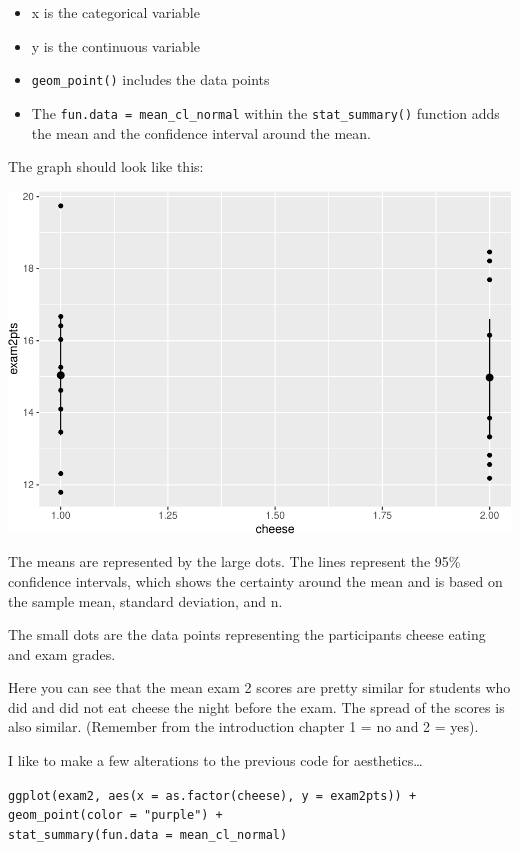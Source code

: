 \documentclass[
]{book}
\providecommand{\tightlist}{%
  \setlength{\itemsep}{0pt}\setlength{\parskip}{0pt}}
\begin{document}
\begin{itemize}
\tightlist
\item
  x is the categorical variable\\
\item
  y is the continuous variable\\
\item
  \texttt{geom\_point()} includes the data points\\
\item
  The \texttt{fun.data\ =\ mean\_cl\_normal} within the \texttt{stat\_summary()} function adds the mean and the confidence interval around the mean.
\end{itemize}

The graph should look like this:

\includegraphics{Tools-for-working-with-data-211_files/figure-latex/unnamed-chunk-3-1.pdf}

The means are represented by the large dots. The lines represent the 95\% confidence intervals, which shows the certainty around the mean and is based on the sample mean, standard deviation, and n.~

The small dots are the data points representing the participants cheese eating and exam grades.

Here you can see that the mean exam 2 scores are pretty similar for students who did and did not eat cheese the night before the exam. The spread of the scores is also similar. (Remember from the introduction chapter 1 = no and 2 = yes).

I like to make a few alterations to the previous code for aesthetics\ldots{}

\texttt{ggplot(exam2,\ aes(x\ =\ as.factor(cheese),\ y\ =\ exam2pts))\ +}\\
\texttt{geom\_point(color\ =\ "purple")\ +}~\\
\texttt{stat\_summary(fun.data\ =\ mean\_cl\_normal)}
\end{document}
